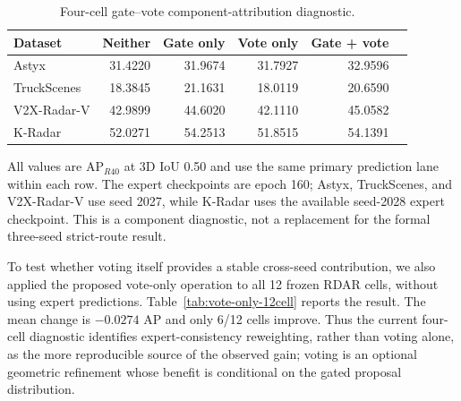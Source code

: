 \documentclass[preprint,12pt,times]{elsarticle}
\newcommand{\reviewcaption}[1]{\caption{\textcolor{floatreviewblue}{#1}}}
\newcommand{\reviewcaption}[1]{\caption{#1}}
\begin{document}
\begin{table}[!t]
\centering
\reviewcaption{Four-cell gate--vote component-attribution diagnostic.}
\label{tab:gate-vote-factorial}
\begingroup
\color{black}
\scriptsize
\setlength{\tabcolsep}{3pt}
\renewcommand{\arraystretch}{1.12}
\begin{tabularx}{\columnwidth}{@{}Xrrrrr@{}}
\toprule
Dataset & Neither & Gate only & Vote only & Gate + vote \\
\midrule
Astyx & 31.4220 & 31.9674 & 31.7927 & 32.9596 \\
TruckScenes & 18.3845 & 21.1631 & 18.0119 & 20.6590 \\
V2X-Radar-V & 42.9899 & 44.6020 & 42.1110 & 45.0582 \\
K-Radar & 52.0271 & 54.2513 & 51.8515 & 54.1391 \\
\bottomrule
\end{tabularx}
\endgroup
\vspace{2pt}
\parbox{\columnwidth}{\scriptsize
All values are AP$_{R40}$ at 3D IoU 0.50 and use the same primary prediction
lane within each row. The expert checkpoints are epoch 160; Astyx, TruckScenes,
and V2X-Radar-V use seed 2027, while K-Radar uses the available seed-2028
expert checkpoint. This is a component diagnostic, not a replacement for the
formal three-seed strict-route result.}
\end{table}

To test whether voting itself provides a stable cross-seed contribution, we
also applied the proposed vote-only operation to all 12 frozen RDAR cells,
without using expert predictions. Table~\ref{tab:vote-only-12cell} reports the
result. The mean change is $-0.0274$ AP and only 6/12 cells improve. Thus the
current four-cell diagnostic identifies expert-consistency reweighting, rather
than voting alone, as the more reproducible source of the observed gain; voting is an
optional geometric refinement whose benefit is conditional on the gated
proposal distribution.
\end{document}
